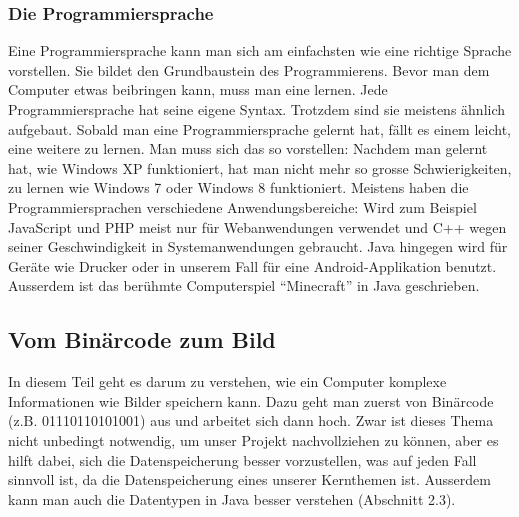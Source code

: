 \subsubsection{Die Programmiersprache}
Eine Programmiersprache kann man sich am einfachsten wie eine richtige Sprache vorstellen. Sie bildet den Grundbaustein des Programmierens. Bevor man dem Computer etwas  beibringen kann, muss man eine lernen. Jede Programmiersprache hat seine eigene Syntax. Trotzdem sind sie meistens ähnlich aufgebaut. Sobald man eine Programmiersprache gelernt hat, fällt es einem leicht, eine weitere zu lernen. Man muss sich das so vorstellen: Nachdem man gelernt hat, wie Windows XP funktioniert, hat man nicht mehr so grosse Schwierigkeiten, zu lernen wie Windows 7 oder Windows 8 funktioniert. Meistens haben die Programmiersprachen verschiedene Anwendungsbereiche: Wird zum Beispiel JavaScript und PHP meist nur für Webanwendungen verwendet und C++ wegen seiner Geschwindigkeit in Systemanwendungen gebraucht. Java hingegen wird für Geräte wie Drucker oder in unserem Fall für eine Android-Applikation benutzt. Ausserdem ist das berühmte Computerspiel "`Minecraft"' in Java geschrieben.
\subsection{Vom Binärcode zum Bild}
In diesem Teil geht es darum zu verstehen, wie ein Computer komplexe Informationen wie Bilder speichern kann. Dazu geht man zuerst von Binärcode (z.B. 01110110101001) aus und arbeitet sich dann hoch. Zwar ist dieses Thema nicht unbedingt notwendig, um unser Projekt nachvollziehen zu können, aber es hilft dabei, sich die Datenspeicherung besser vorzustellen, was auf jeden Fall sinnvoll ist, da die Datenspeicherung eines unserer Kernthemen ist. Ausserdem kann man auch die Datentypen in Java besser verstehen (Abschnitt 2.3).
